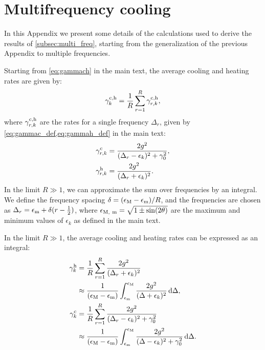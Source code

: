 \section{Multifrequency cooling}
\label{app:multifrequency_cooling}

In this Appendix we present some details of the calculations used to derive the results of \cref{subsec:multi_freq}, starting from the generalization of the previous Appendix to multiple frequencies.


Starting from \cref{eq:gammach} in the main text, the average cooling and heating rates are given by:
\begin{equation}
    \gamma^{\rm c,h}_k = \frac{1}{R} \sum_{r=1}^R \gamma^{\rm c,h}_{r,k},
\end{equation}
where $\gamma^{\rm c,h}_{r,k}$ are the rates for a single frequency $\Delta_r$, given by \cref{eq:gammac_def,eq:gammah_def} in the main text:
\begin{align}
    \gamma^{\rm c}_{r,k} &= \frac{2g^2}{(\Delta_r-\epsilon_k)^2+ \gamma_0^2},\\
    \gamma^{\rm h}_{r,k} &= \frac{2g^2}{(\Delta_r+\epsilon_k)^2}.
\end{align}
In the limit $R \gg 1$, we can approximate the sum over frequencies by an integral. We define the frequency spacing $\delta = (\epsilon_{\rm M} - \epsilon_{\rm m}) / R$, and the frequencies are chosen as $\Delta_r = \epsilon_{\rm m} + \delta (r - \frac{1}{2})$, where $\epsilon_{\rm M,\ m} = \sqrt{1\pm \sin(2\theta)}$ are the maximum and minimum values of $\epsilon_k$ as defined in the main text.

In the limit $R\gg 1$, the average cooling and heating rates can be expressed as an integral:
\begin{align}
    \gamma_k^{\rm h} &= \frac{1}{R} \sum_{r=1}^R \frac{2g^2}{(\Delta_r+\epsilon_k)^2} \nonumber\\
                     &\approx \frac{1}{(\epsilon_{\rm M}-\epsilon_{\rm m})} \int_{\epsilon_{\rm m}}^{\epsilon_{\rm M}} \frac{2g^2}{(\Delta+\epsilon_k)^2} \mathop{}\!\mathrm{d}\Delta,\\
    \gamma_k^{\rm c} &= \frac{1}{R} \sum_{r=1}^R \frac{2g^2}{(\Delta_r-\epsilon_k)^2+ \gamma_0^2} \nonumber\\
                     &\approx \frac{1}{(\epsilon_{\rm M}-\epsilon_{\rm m})} \int_{\epsilon_{\rm m}}^{\epsilon_{\rm M}} \frac{2g^2}{(\Delta-\epsilon_k)^2+ \gamma_0^2} \mathop{}\!\mathrm{d}\Delta.
\end{align}

